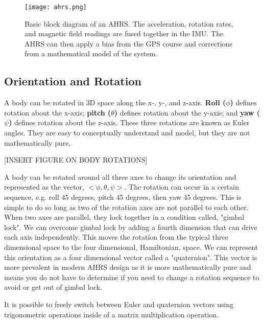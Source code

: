 \begin{figure}[h!]
    \caption[AHRS block diagram]{Basic block diagram of an AHRS. 
    The acceleration, rotation rates, and magnetic field readings are fused together in the IMU. 
    The AHRS can then apply a bias from the GPS course and corrections from a mathematical model of the system.}
    \label{fig:ahrs_design}
    \centering
    \texttt{[image: ahrs.png]}
\end{figure}

\subsection{Orientation and Rotation} \label{ssec:bkg_orientation}
A body can be rotated in 3D space along the x-, y-, and z-axis.
\textbf{Roll ($\phi$)} defines rotation about the x-axis; \textbf{pitch ($\theta$)} defines rotation about the y-axis; and \textbf{yaw ($\psi$)} defines rotation about the z-axis.
These three rotations are known as Euler angles.
They are easy to conceptually understand and model, but they are not mathematically pure.

[INSERT FIGURE ON BODY ROTATIONS]

A body can be rotated around all three axes to change its orientation and represented as the vector, $<\phi, \theta, \psi>$.
The rotation can occur in a certain sequence, e.g. roll 45 degrees, pitch 45 degrees, then yaw 45 degrees.
This is simple to do so long as two of the rotation axes are not parallel to each other.
When two axes are parallel, they lock together in a condition called, "gimbal lock". 
We can overcome gimbal lock by adding a fourth dimension that can drive each axis independently.
This moves the rotation from the typical three dimensional space to the four dimensional, Hamiltonian, space.
We can represent this orientation as a four dimensional vector called a "quaternion".
This vector is more prevalent in modern AHRS design as it is more mathematically pure and means you do not have to determine if you need to change a rotation sequence to avoid or get out of gimbal lock.

It is possible to freely switch between Euler and quaternion vectors using trigonometric operations inside of a matrix multiplication operation.

